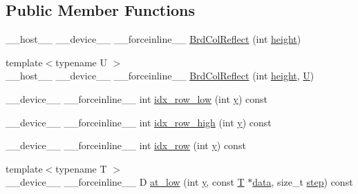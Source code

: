 \subsection*{Public Member Functions}
\begin{DoxyCompactItemize}
\item 
\-\_\-\-\_\-host\-\_\-\-\_\- \-\_\-\-\_\-device\-\_\-\-\_\- \-\_\-\-\_\-forceinline\-\_\-\-\_\- \hyperlink{structcv_1_1gpu_1_1device_1_1BrdColReflect_a143c45aed97244ac5c1d9b07724b773b}{Brd\-Col\-Reflect} (int \hyperlink{highgui__c_8h_adc7b4b8a6ef510e136071efbc9cd9a58}{height})
\item 
{\footnotesize template$<$typename U $>$ }\\\-\_\-\-\_\-host\-\_\-\-\_\- \-\_\-\-\_\-device\-\_\-\-\_\- \-\_\-\-\_\-forceinline\-\_\-\-\_\- \hyperlink{structcv_1_1gpu_1_1device_1_1BrdColReflect_a143ad634d5ede701a7d7db8ae8c3f30b}{Brd\-Col\-Reflect} (int \hyperlink{highgui__c_8h_adc7b4b8a6ef510e136071efbc9cd9a58}{height}, \hyperlink{core__c_8h_aa9c521f41af9a5191e5e4b6ffbae211a}{U})
\item 
\-\_\-\-\_\-device\-\_\-\-\_\- \-\_\-\-\_\-forceinline\-\_\-\-\_\- int \hyperlink{structcv_1_1gpu_1_1device_1_1BrdColReflect_af169bd91a37d5844199d2dcd7f8a4030}{idx\-\_\-row\-\_\-low} (int \hyperlink{highgui__c_8h_af1202c02b14870c18fb3a1da73e9e7c7}{y}) const 
\item 
\-\_\-\-\_\-device\-\_\-\-\_\- \-\_\-\-\_\-forceinline\-\_\-\-\_\- int \hyperlink{structcv_1_1gpu_1_1device_1_1BrdColReflect_ac03d7e388bf647e9d69f690da8669335}{idx\-\_\-row\-\_\-high} (int \hyperlink{highgui__c_8h_af1202c02b14870c18fb3a1da73e9e7c7}{y}) const 
\item 
\-\_\-\-\_\-device\-\_\-\-\_\- \-\_\-\-\_\-forceinline\-\_\-\-\_\- int \hyperlink{structcv_1_1gpu_1_1device_1_1BrdColReflect_a6c842b479b953a99e8a014ef920b4e21}{idx\-\_\-row} (int \hyperlink{highgui__c_8h_af1202c02b14870c18fb3a1da73e9e7c7}{y}) const 
\item 
{\footnotesize template$<$typename T $>$ }\\\-\_\-\-\_\-device\-\_\-\-\_\- \-\_\-\-\_\-forceinline\-\_\-\-\_\- D \hyperlink{structcv_1_1gpu_1_1device_1_1BrdColReflect_a619342a5c2fa9b59cc7ee4b9bcc7744e}{at\-\_\-low} (int \hyperlink{highgui__c_8h_af1202c02b14870c18fb3a1da73e9e7c7}{y}, const \hyperlink{calib3d_8hpp_a3efb9551a871ddd0463079a808916717}{T} $\ast$\hyperlink{legacy_8hpp_ab9fe6c09e6d02865a953fffc12fe6ca0}{data}, size\-\_\-t \hyperlink{legacy_8hpp_abc16e65f240ed0c8f3e876e8732c0a33}{step}) const 
\item 

\end{DoxyCompactItemize}
